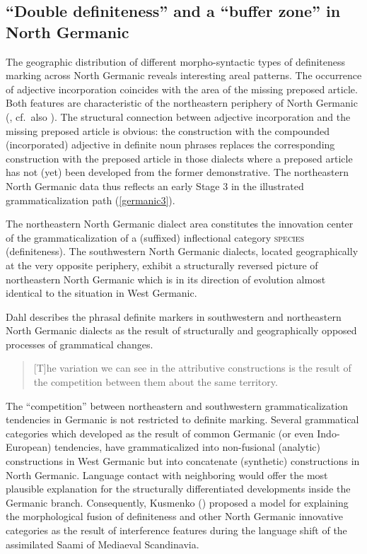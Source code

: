 {\subsection{“Double definiteness” and a “buffer zone” in North Germanic}
\label{buffer}
The geographic distribution of different morpho-syntactic types of definiteness marking across North Germanic reveals interesting areal patterns. The occurrence of adjective incorporation coincides with the area of the missing preposed article. Both features are characteristic of the northeastern periphery of North Germanic (\citealt{delsing1996b}, cf.~also \citealt{riesler2001a,riesler2002a}). The structural connection between adjective incorporation and the missing preposed article is obvious: the construction with the compounded (incorporated) adjective in definite noun phrases replaces the corresponding construction with the preposed article in those dialects where a preposed article has not (yet) been developed from the former demonstrative. The northeastern North Germanic data thus reflects an early Stage 3 in the illustrated grammaticalization path (\ref{germanic3}).

The northeastern North Germanic dialect area constitutes the innovation center of the grammaticalization of a (suffixed) inflectional category \textsc{species} (definiteness). The southwestern North Germanic dialects, located geographically at the very opposite periphery, exhibit a structurally reversed picture of northeastern North Germanic which is in its direction of evolution almost identical to the situation in West Germanic.

Dahl describes the phrasal definite markers in southwestern and northeastern North Germanic dialects as the result of structurally and geographically opposed processes of grammatical changes.
\begin{quote}
[T]he variation we can see in the attributive constructions is the result of the competition between them about the same territory. \citep[147]{dahl2003}
\end{quote}
The “competition” between northeastern and southwestern grammaticalization tendencies in Germanic is not restricted to definite marking. Several grammatical categories which developed as the result of common Germanic (or even Indo-European) tendencies, have grammaticalized into non-fusional (analytic) constructions in West Germanic but into concatenate (synthetic) constructions in North Germanic. Language contact with neighboring  would offer the most plausible explanation for the structurally differentiated developments inside the Germanic branch. Consequently, Kusmenko (\citeyear{kusmenko2008}) proposed a model for explaining the morphological fusion of definiteness and other North Germanic innovative categories as the result of interference features during the language shift of the assimilated Saami of Mediaeval Scandinavia.

}

